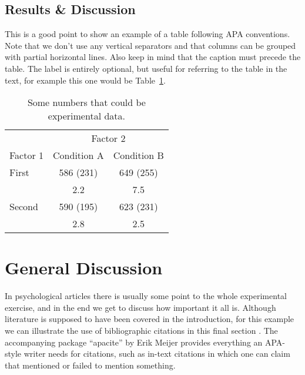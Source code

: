 \documentclass[man]{apa}
\begin{document}
\subsection{Results \& Discussion}
This is a good point to show an example of a table following APA conventions. Note that we don't use any vertical separators and that columns can be grouped with partial horizontal lines.  
Also keep in mind that the caption must precede the table. The label is entirely optional, but useful for referring to the table in the text, for example this one would be Table~\ref{tab:tab1}.
\begin{table}[tbp]
\caption{Some numbers that could be experimental data.}
\label{tab:tab1}
\begin{tabular}{lcc}\hline
          & \multicolumn{2}{c}{Factor 2} \\ \cline{2-3}
Factor 1  & Condition A  & Condition B   \\ \hline
First     & 586 (231)    & 649 (255)     \\
          &    2.2       &    7.5        \\
Second    & 590 (195)    & 623 (231)     \\
          &    2.8       &    2.5        \\ \hline
\end{tabular}
\end{table}

\section{General Discussion}
In psychological articles there is usually some point to the whole experimental exercise, and in the end we get to discuss how important it all is.  Although literature is supposed to have been covered in the introduction, for this example we can illustrate the use of bibliographic citations in this final section \cite{art1}. The accompanying package ``apacite'' by Erik Meijer provides everything an APA-style writer needs for citations, such as in-text citations in which one can claim that  mentioned or failed to mention something.


\end{document}
